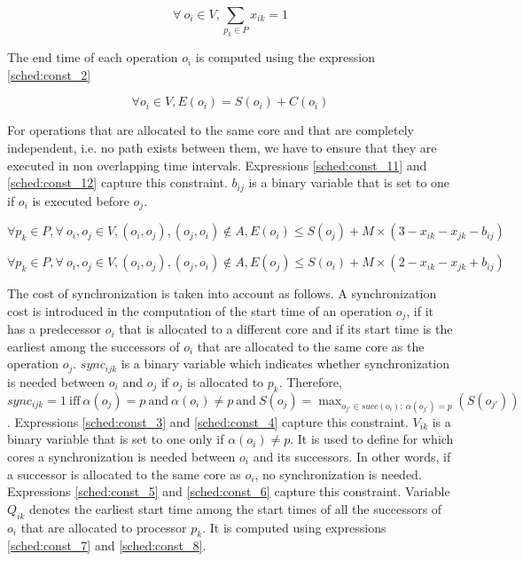 \begin{equation}
\forall\ o_i \in V, \sum_{p_k \in P}x_{ik}=1
\label{sched:const_1}
\end{equation}

The end time of each operation $o_i$ is computed using the expression \ref{sched:const_2}

\begin{equation}
\forall o_i \in V, E(o_i) = S(o_i) + C(o_i)
\label{sched:const_2}
\end{equation}

For operations that are allocated to the same core and that are completely independent, i.e. no path exists between them, we have to ensure that they are executed in non overlapping time intervals. Expressions \ref{sched:const_11} and \ref{sched:const_12} capture this constraint. $b_{ij}$ is a binary variable that is set to one if $o_i$ is executed before $o_j$.

\begin{equation}
\forall p_k \in P, \forall\ o_i, o_j \in V, (o_i,o_j), (o_j,o_i) \notin A, E(o_i) \leq S(o_j) + M \times (3 - x_{ik} - x_{jk} - b_{ij}) 
\label{sched:const_11}
\end{equation}

\begin{equation}
\forall p_k \in P, \forall\ o_i, o_j \in V, (o_i,o_j), (o_j,o_i) \notin A, E(o_j) \leq S(o_i) + M \times (2 - x_{ik} - x_{jk} + b_{ij}) 
\label{sched:const_12}
\end{equation}

The cost of synchronization is taken into account as follows. A synchronization cost is introduced in the computation of the start time of an operation $o_j$, if it has a predecessor $o_i$ that is allocated to a different core and if its start time is the earliest among the successors of $o_i$ that are allocated to the same core as the operation $o_j$. $sync_{ijk}$ is a binary variable which indicates whether synchronization is needed between $o_i$ and $o_j$ if $o_j$ is allocated to $p_k$. Therefore, $sync_{ijk} = 1\ \text{iff}\ \alpha(o_j)=p\ \text{and}\ \alpha(o_i)\neq p\  \text{and}\ S(o_j) = \max_{o_{j'} \in succ(o_i):\  \alpha(o_{j'}) = p}(S(o_{j'}))$. Expressions \ref{sched:const_3} and \ref{sched:const_4} capture this constraint. $V_{ik}$ is a binary variable that is set to one only if $\alpha(o_i) \neq p$. It is used to define for which cores a synchronization is needed between $o_i$ and its successors. In other words, if a successor is allocated to the same core as $o_i$, no synchronization is needed. Expressions \ref{sched:const_5} and \ref{sched:const_6} capture this constraint. Variable $Q_{ik}$ denotes the earliest start time among the start times of all the successors of $o_i$ that are allocated to processor $p_k$. It is computed using expressions \ref{sched:const_7} and \ref{sched:const_8}. 


